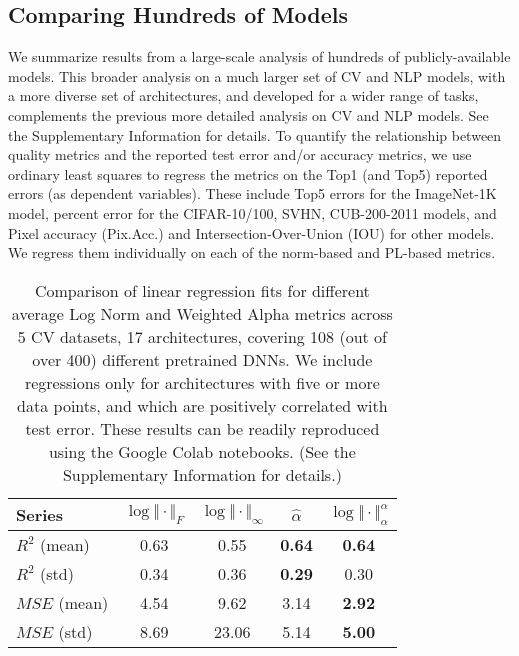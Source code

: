 \subsection{Comparing Hundreds of Models}
\label{sxn:all_cv_models}

We summarize results from a large-scale analysis of hundreds of publicly-available  models.
This broader analysis on a much larger set of CV and NLP models, with a more diverse set of architectures, and developed for a wider range of tasks, complements the previous more detailed analysis on CV and NLP models.
See the Supplementary Information
for details.
To quantify the relationship between quality metrics and the reported test error and/or accuracy metrics, we use ordinary least squares to regress the metrics on the Top1 (and Top5) reported errors (as dependent variables).
These include Top5 errors for the ImageNet-1K model, percent error for the CIFAR-10/100, SVHN, CUB-200-2011 models, and Pixel accuracy (Pix.Acc.) and Intersection-Over-Union (IOU) for other models.
We regress them individually on each of the norm-based and PL-based metrics.


\begin{table}[t]
\small
\begin{center}
\begin{tabular}{|p{1in}|c|c|c|c|}
\hline
Series        & $\log\Vert\cdot\Vert_{F}$ & $\log\Vert\cdot\Vert_{\infty}$ & $\hat{\alpha}$ & $\log\Vert\cdot\Vert^{\alpha}_{\alpha}$ \\
\hline
$R^{2}$ (mean) & 0.63 &  0.55 & \textbf{0.64} & \textbf{0.64} \\
$R^{2}$ (std)  & 0.34 &  0.36 & \textbf{0.29} &          0.30 \\
\hline
$MSE$ (mean)   & 4.54 &  9.62 &          3.14 & \textbf{2.92} \\
$MSE$ (std)    & 8.69 & 23.06 &          5.14 & \textbf{5.00} \\
\hline
\end{tabular}
\end{center}
\caption{Comparison of linear regression fits for different average Log Norm and Weighted Alpha metrics across 5 CV datasets, 17 architectures, covering 108 (out of over 400) different pretrained DNNs.  
         We include regressions only for architectures with five or more data points, and which are positively correlated with test error.
         These results can be readily reproduced using the Google Colab notebooks. 
         (See the Supplementary Information
         for details.) 
        }
\label{table:results}
\end{table}


